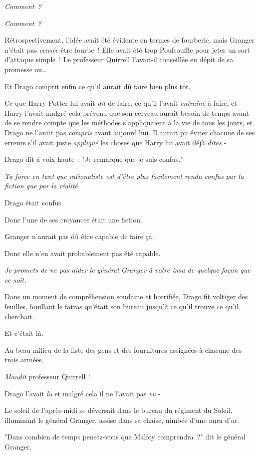 \emph{Comment~?}

\emph{Comment~?}

Rétrospectivement, l'idée avait été évidente en termes de fourberie, mais Granger n'était pas \emph{censée} être fourbe~! Elle avait été trop Poufsouffle pour jeter un sort d'attaque simple~! Le professeur Quirrell l'avait-il conseillée en dépit de sa promesse ou…

Et Drago comprit enfin ce qu'il aurait dû faire bien plus tôt.

Ce que Harry Potter lui avait \emph{dit} de faire, ce qu'il l'avait \emph{entraîné} à faire, et Harry l'avait malgré cela prévenu que son cerveau aurait besoin de temps avant de se rendre compte que les méthodes s'appliquaient à la vie de tous les jours, et Drago ne l'avait pas \emph{compris} avant aujourd'hui. Il aurait pu éviter chacune de ses erreurs s'il avait juste \emph{appliqué} les choses que Harry lui avait déjà \emph{dites} -

Drago dit à voix haute~: "Je remarque que je suis confus."

\emph{Ta force en tant que rationaliste est d'être plus facilement rendu confus par la fiction que par la réalité.}

Drago était confus.

Donc l'une de ses croyances était une fiction.

Granger n'aurait pas dû être capable de faire ça.

Donc elle n'en avait probablement pas été capable.

\emph{Je promets de ne pas aider le général Granger à votre insu de quelque façon que ce soit.}

Dans un moment de compréhension soudaine et horrifiée, Drago fit voltiger des feuilles, fouillant le fatras qu'était son bureau jusqu'à ce qu'il trouve ce qu'il cherchait.

Et c'était là.

Au beau milieu de la liste des gens et des fournitures assignées à chacune des trois armées.

\emph{Maudit} professeur Quirrell~!

Drago l'avait \emph{lu} et malgré cela il ne l'avait pas \emph{vu} -

\later

Le soleil de l'après-midi se déversait dans le bureau du régiment du Soleil, illuminant le général Granger, assise dans sa chaise, nimbée d'une aura d'or.

"Dans combien de temps pensez-vous que Malfoy comprendra~?" dit le général Granger.

